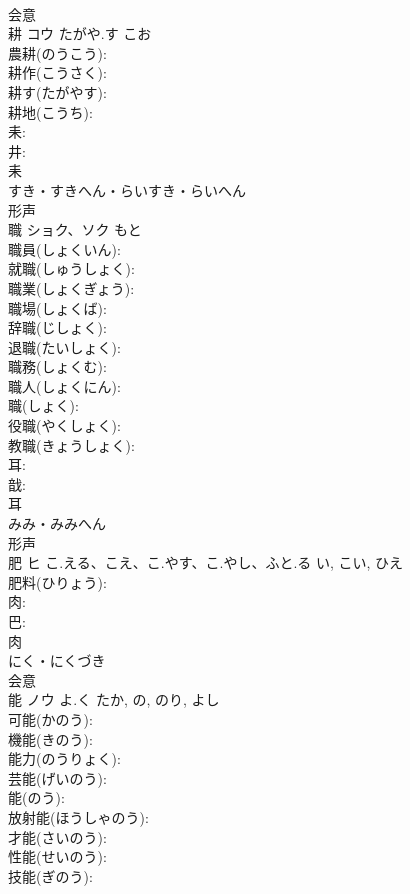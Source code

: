 \documentclass[8pt]{extreport}
\begin{document}
\begin{CJK}{UTF8}{min}
\\	会意 
\\	耕	コウ	たがや.す	こお	
\\	農耕(のうこう): 
\\	耕作(こうさく): 
\\	耕す(たがやす): 
\\	耕地(こうち): 
\\	耒: 
\\	井: 
\\	耒	
\\	すき・すきへん・らいすき・らいへん	
\\	形声 
\\	職	ショク、ソク		もと	
\\	職員(しょくいん): 
\\	就職(しゅうしょく): 
\\	職業(しょくぎょう): 
\\	職場(しょくば): 
\\	辞職(じしょく): 
\\	退職(たいしょく): 
\\	職務(しょくむ): 
\\	職人(しょくにん): 
\\	職(しょく): 
\\	役職(やくしょく): 
\\	教職(きょうしょく): 
\\	耳: 
\\	戠: 
\\	耳	
\\	みみ・みみへん	
\\	形声 
\\	肥	ヒ	こ.える、こえ、こ.やす、こ.やし、ふと.る	い, こい, ひえ	
\\	肥料(ひりょう): 
\\	肉: 
\\	巴: 
\\	肉	
\\	にく・にくづき	
\\	会意 
\\	能	ノウ	よ.く	たか, の, のり, よし	
\\	可能(かのう): 
\\	機能(きのう): 
\\	能力(のうりょく): 
\\	芸能(げいのう): 
\\	能(のう): 
\\	放射能(ほうしゃのう): 
\\	才能(さいのう): 
\\	性能(せいのう): 
\\	技能(ぎのう): 

\end{CJK}
\end{document}
